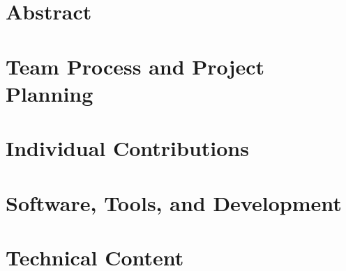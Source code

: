 \documentclass[11pt,a4paper,dvipsnames,cmyk,titlepage]{scrartcl}
\begin{document}
\section{Abstract}
\section{Team Process and Project Planning}
\section{Individual Contributions}
\section{Software, Tools, and Development}
\section{Technical Content}
\end{document}
